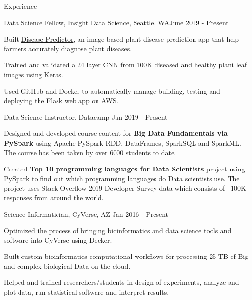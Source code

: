 \documentclass{resume} %
\begin{document}
\begin{rSection}{Experience } \itemsep -1pt        

\begin{rSubsection}{Data Science Fellow, Insight Data Science, Seattle, WA}{June 2019 - Present}{}    

\vspace{-3pt}

\item Built \href{https://disease-predictor.onrender.com}{Disease Predictor}, an image-based plant disease prediction app that help farmers accurately diagnose plant diseases.
\item Trained and validated a 24 layer CNN from 100K diseased and healthy plant leaf images using Keras.
\item Used GitHub and Docker to automatically manage building, testing and deploying the Flask web app on AWS.
\end{rSubsection} 

\vspace{-3pt}

\begin{rSubsection}{Data Science Instructor, Datacamp}
{Jan 2019 - Present}{}{}  %
\vspace{-3pt}
\item Designed and developed course content for \textbf{Big Data Fundamentals via PySpark} using Apache PySpark RDD, DataFrames, SparkSQL and SparkML. The course has been taken by over 6000 students to date.
\item Created \textbf{Top 10 programming languages for Data Scientists} project using PySpark to find out which programming languages do Data scientists use. The project uses Stack Overflow 2019 Developer Survey data which consists of ~100K responses from around the world.
\vspace{-3pt}
\end{rSubsection}  

\begin{rSubsection}{Science Informatician, CyVerse, AZ }{Jan 2016 - Present}{}    

\vspace{-3pt}

\item Optimized the process of bringing bioinformatics and data science tools and software into CyVerse using Docker.
\item Built custom bioinformatics computational workflows for processing 25 TB of Big and complex biological Data on the cloud.
\item Helped and trained researchers/students in design of experiments, analyze and plot data, run statistical software and interpret results.
\end{rSubsection} 


\end{rSection}
\end{document}
